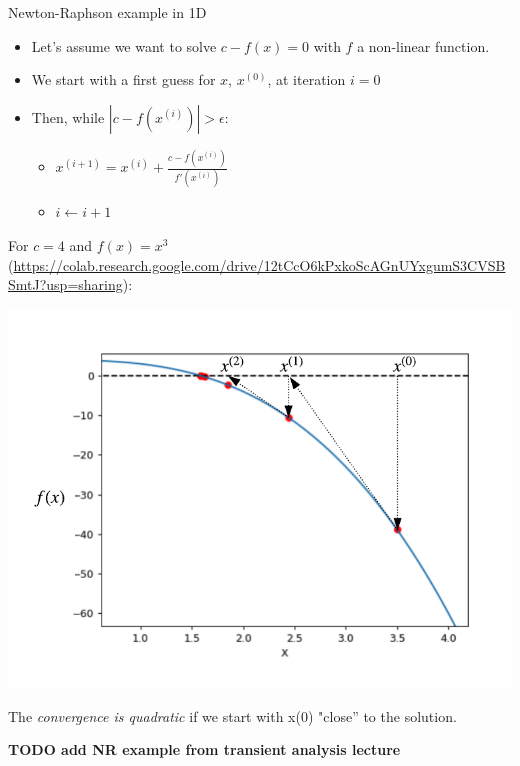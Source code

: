 \begin{frame}[allowframebreaks]{Newton-Raphson example in 1D}
    \begin{itemize}
        \item Let's assume we want to solve $c-f(x) = 0$ with $f$ a non-linear function.
        \item We start with a first guess for $x$, $x^{(0)}$, at iteration $i=0$
        \item Then, while $|c-f(x^{(i)})| > \epsilon$:
        \begin{itemize}
            \item $x^{(i+1)} = x^{(i)} + \frac{c-f(x^{(i)})}{f'(x^{(i)})}$
            \item $i \leftarrow i + 1$
        \end{itemize}
    \end{itemize}
    
    For $c=4$ and $f(x) = x^3$ (\url{https://colab.research.google.com/drive/12tCcO6kPxkoScAGnUYxgumS3CVSBSmtJ?usp=sharing}):
    \begin{center}
        \includegraphics[width=0.5\linewidth]{images/NR-1D.png}
    \end{center}
    
    The \textit{convergence is quadratic} if we start with x(0) "close” to the solution.

    \textbf{TODO add NR example from transient analysis lecture}

\end{frame}

